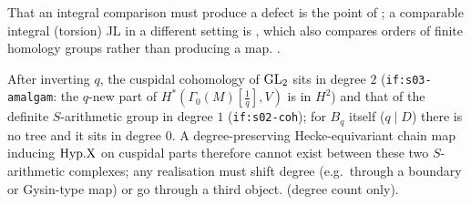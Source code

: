 \begin{remark}[context]\label{rem:s05-context}
That an integral comparison must produce a defect is the point of
;
a comparable integral (torsion) JL in a different setting is
, which also
compares orders of finite homology groups rather than producing a map. \stcited.
\end{remark}

\begin{remark}\label{rem:s05-degree}
After inverting $q$, the cuspidal cohomology of $\mathrm{GL}_2$ sits in degree $2$ (\texttt{if:s03-amalgam}: the $q$-new part of
$H^*(\Gamma_0(M)[\frac1q],V)$ is in $H^2$) and that of the definite $S$-arithmetic group in degree $1$
(\texttt{if:s02-coh}); for $B_q$ itself ($q\mid D$) there is no tree and it sits in degree $0$. A degree-preserving Hecke-equivariant
chain map inducing $\mathrm{Hyp.X}$ on cuspidal parts therefore cannot exist between these two $S$-arithmetic complexes; any realisation
must shift degree (e.g.\ through a boundary or Gysin-type map) or go through a third object. \stsketch{} (degree count only).
\end{remark}

